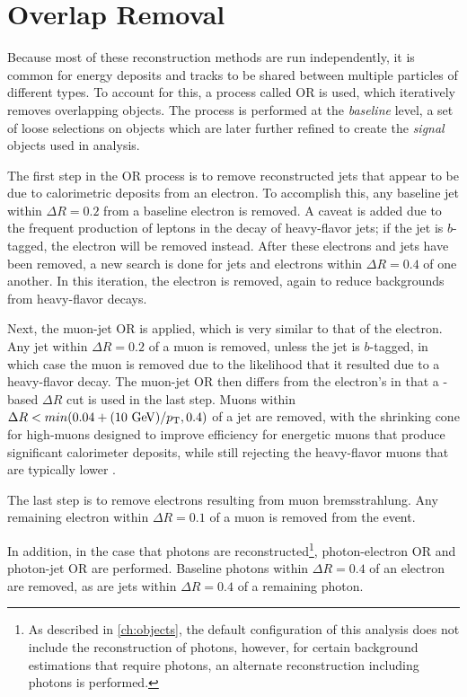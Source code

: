 \section{Overlap Removal}
\label{sec:reco_or}

Because most of these reconstruction methods are run independently, it is common for energy deposits and tracks to be shared between multiple particles of different types. To account for this, a process called \acf{OR} is used, which iteratively removes overlapping objects. The process is performed at the \textit{baseline} level, a set of loose selections on objects which are later further refined to create the \textit{signal} objects used in analysis.

The first step in the \ac{OR} process is to remove reconstructed jets that appear to be due to calorimetric deposits from an electron. To accomplish this, any baseline jet within $\Delta R = 0.2$ from a baseline electron is removed. A caveat is added due to the frequent production of leptons in the decay of heavy-flavor jets; if the jet is $b$-tagged, the electron will be removed instead. After these electrons and jets have been removed, a new search is done for jets and electrons within $\Delta R = 0.4$ of one another. In this iteration, the electron is removed, again to reduce backgrounds from heavy-flavor decays.

Next, the muon-jet \ac{OR} is applied, which is very similar to that of the electron. Any jet within $\Delta R = 0.2$ of a muon is removed, unless the jet is $b$-tagged, in which case the muon is removed due to the likelihood that it resulted due to a heavy-flavor decay. The muon-jet \ac{OR} then differs from the electron's in that a \pt-based $\Delta R$ cut is used in the last step. Muons within $\Delta R < min(0.04 + (10 \gev)/\pt, 0.4)$ of a jet are removed, with the shrinking cone for high-\pt muons designed to improve efficiency for energetic muons that produce significant calorimeter deposits, while still rejecting the heavy-flavor muons that are typically lower \pt. 

The last step is to remove electrons resulting from muon bremsstrahlung. Any remaining electron within $\Delta R = 0.1$ of a muon is removed from the event. 

In addition, in the case that photons are reconstructed\footnote{As described in \autoref{ch:objects}, the default configuration of this analysis does not include the reconstruction of photons, however, for certain background estimations that require photons, an alternate reconstruction including photons is performed.}, photon-electron \ac{OR} and photon-jet \ac{OR} are performed. Baseline photons within $\Delta R = 0.4$ of an electron are removed, as are jets within $\Delta R = 0.4$ of a remaining photon.

